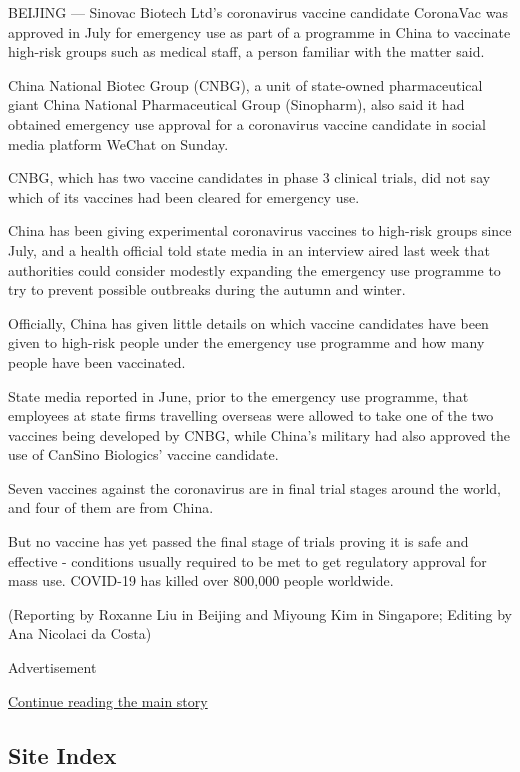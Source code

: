BEIJING --- Sinovac Biotech Ltd's coronavirus vaccine candidate
CoronaVac was approved in July for emergency use as part of a programme
in China to vaccinate high-risk groups such as medical staff, a person
familiar with the matter said.

China National Biotec Group (CNBG), a unit of state-owned pharmaceutical
giant China National Pharmaceutical Group (Sinopharm), also said it had
obtained emergency use approval for a coronavirus vaccine candidate in
social media platform WeChat on Sunday.

CNBG, which has two vaccine candidates in phase 3 clinical trials, did
not say which of its vaccines had been cleared for emergency use.

China has been giving experimental coronavirus vaccines to high-risk
groups since July, and a health official told state media in an
interview aired last week that authorities could consider modestly
expanding the emergency use programme to try to prevent possible
outbreaks during the autumn and winter.

Officially, China has given little details on which vaccine candidates
have been given to high-risk people under the emergency use programme
and how many people have been vaccinated.

State media reported in June, prior to the emergency use programme, that
employees at state firms travelling overseas were allowed to take one of
the two vaccines being developed by CNBG, while China's military had
also approved the use of CanSino Biologics' vaccine candidate.

Seven vaccines against the coronavirus are in final trial stages around
the world, and four of them are from China.

But no vaccine has yet passed the final stage of trials proving it is
safe and effective - conditions usually required to be met to get
regulatory approval for mass use. COVID-19 has killed over 800,000
people worldwide.

(Reporting by Roxanne Liu in Beijing and Miyoung Kim in Singapore;
Editing by Ana Nicolaci da Costa)

Advertisement

\protect\hyperlink{after-bottom}{Continue reading the main story}

\hypertarget{site-index}{%
\subsection{Site Index}\label{site-index}}

